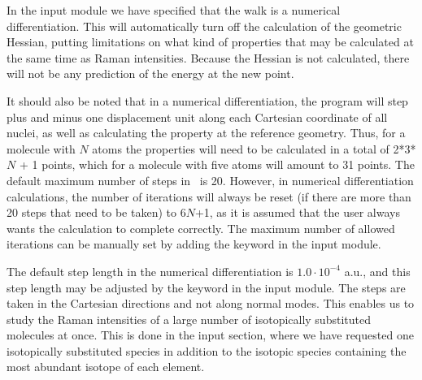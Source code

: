 In the  input module we have specified
that the walk is a numerical differentiation. This will automatically
turn off the calculation of the geometric Hessian,
putting limitations
on what kind of properties that may be calculated at the same time as
Raman intensities. Because the Hessian is not calculated,
there will not be any prediction of the energy at the new
point.

It should also be noted that  in a numerical
differentiation, the
program will
step plus and minus one displacement unit along each Cartesian coordinate
of all nuclei, as well as calculating the property at the reference
geometry. Thus, for a molecule with $N$ atoms the properties will need
to be calculated in a total of 2*3*$N$ + 1 points, which for a 
molecule with five atoms will amount to 31 points. The default maximum number of
steps in \siraba\ is 20. However, in numerical differentiation
calculations, the number of iterations will always be reset (if there
are more than 20 steps that need to be taken) to 6$N$+1, as it is
assumed that the user always wants the calculation to complete
correctly. The maximum number of allowed iterations can be manually set by adding the keyword
 in the  input module.

The default step length in the numerical
differentiation is $1.0\cdot 10^{-4}$
a.u., and this step length may be adjusted by the keyword
 in the  input module. The steps are taken
in the Cartesian directions and
not along normal modes. This enables us to study the Raman intensities
of a large number of isotopically substituted molecules at once. This
is done in the  input section, where we
have requested one isotopically substituted species in addition to the
isotopic species containing the most abundant isotope of each element.
